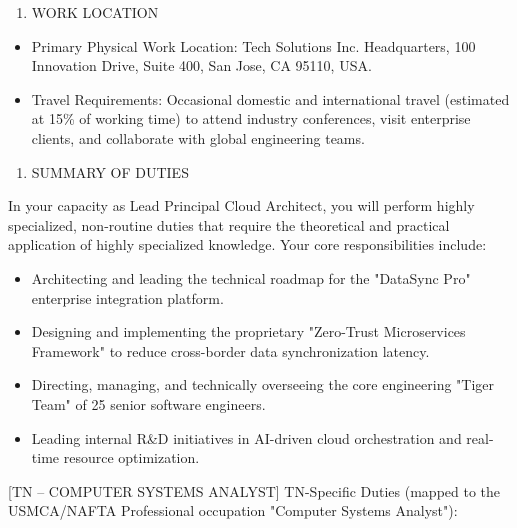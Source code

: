 \begin{enumerate}

\item WORK LOCATION

\end{enumerate}

\begin{itemize}

\item Primary Physical Work Location: Tech Solutions Inc. Headquarters, 100 Innovation Drive, Suite 400, San Jose, CA 95110, USA.

\item Travel Requirements: Occasional domestic and international travel (estimated at 15\% of working time) to attend industry conferences, visit enterprise clients, and collaborate with global engineering teams.

\end{itemize}

\begin{enumerate}

\item SUMMARY OF DUTIES

\end{enumerate}

In your capacity as Lead Principal Cloud Architect, you will perform highly specialized, non-routine duties that require the theoretical and practical application of highly specialized knowledge. Your core responsibilities include:

\begin{itemize}

\item Architecting and leading the technical roadmap for the "DataSync Pro" enterprise integration platform.

\item Designing and implementing the proprietary "Zero-Trust Microservices Framework" to reduce cross-border data synchronization latency.

\item Directing, managing, and technically overseeing the core engineering "Tiger Team" of 25 senior software engineers.

\item Leading internal R\&D initiatives in AI-driven cloud orchestration and real-time resource optimization.

\end{itemize}

[TN – COMPUTER SYSTEMS ANALYST] TN-Specific Duties (mapped to the USMCA/NAFTA Professional occupation "Computer Systems Analyst"):

